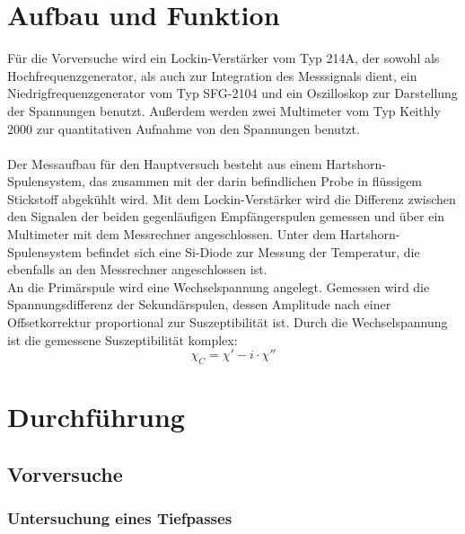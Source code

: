 \documentclass[12pt,a4paper]{article}
\begin{document}
\section{Aufbau und Funktion}
Für die Vorversuche wird ein Lockin-Verstärker vom Typ 214A, der sowohl als Hochfrequenzgenerator, als auch zur Integration des Messsignals dient, ein Niedrigfrequenzgenerator vom Typ SFG-2104 und ein Oszilloskop zur Darstellung der Spannungen benutzt. Außerdem werden zwei Multimeter vom Typ Keithly 2000 zur quantitativen Aufnahme von den Spannungen benutzt.\\
\\
Der Messaufbau für den Hauptversuch besteht aus einem Hartshorn-Spulensystem, das zusammen mit der darin befindlichen Probe in flüssigem Stickstoff abgekühlt wird. Mit dem Lockin-Verstärker wird die Differenz zwischen den Signalen der beiden gegenläufigen Empfängerspulen gemessen und über ein Multimeter mit dem Messrechner angeschlossen. Unter dem Hartshorn-Spulensystem befindet sich eine Si-Diode zur Messung der Temperatur, die ebenfalls an den Messrechner angeschlossen ist.\\
An die Primärspule wird eine Wechselspannung angelegt. Gemessen wird die Spannungsdifferenz der Sekundärspulen, dessen Amplitude nach einer Offsetkorrektur proportional zur Suszeptibilität ist. Durch die Wechselspannung ist die gemessene Suszeptibilität komplex:
\begin{equation*}
\chi_C = \chi' - i\cdot \chi''
\end{equation*}


\section{Durchführung}
\subsection{Vorversuche}
\subsubsection{Untersuchung eines Tiefpasses}
\end{document}
